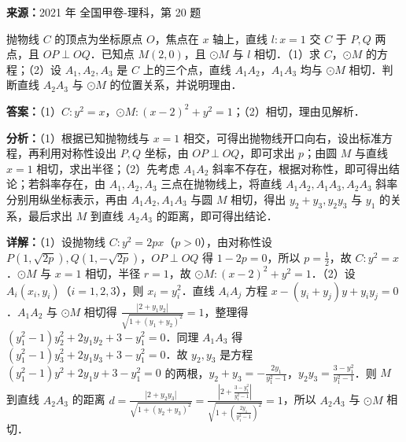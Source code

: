 \begin{question}[points=12]
\textbf{来源：}2021 年 全国甲卷-理科，第 20 题\par
抛物线 $C$ 的顶点为坐标原点 $O$，焦点在 $x$ 轴上，直线 $l: x=1$ 交 $C$ 于 $P, Q$ 两点，且 $OP \perp OQ$．已知点 $M(2,0)$，且 $\odot M$ 与 $l$ 相切．（1）求 $C$，$\odot M$ 的方程；（2）设 $A_1, A_2, A_3$ 是 $C$ 上的三个点，直线 $A_1A_2$，$A_1A_3$ 均与 $\odot M$ 相切．判断直线 $A_2A_3$ 与 $\odot M$ 的位置关系，并说明理由．
\begin{solution}
\textbf{答案：}（1）$C: y^2 = x$，$\odot M: (x-2)^2 + y^2 = 1$；（2）相切，理由见解析．

\textbf{分析：}（1）根据已知抛物线与 $x=1$ 相交，可得出抛物线开口向右，设出标准方程，再利用对称性设出 $P, Q$ 坐标，由 $OP \perp OQ$，即可求出 $p$；由圆 $M$ 与直线 $x=1$ 相切，求出半径；（2）先考虑 $A_1A_2$ 斜率不存在，根据对称性，即可得出结论；若斜率存在，由 $A_1, A_2, A_3$ 三点在抛物线上，将直线 $A_1A_2, A_1A_3, A_2A_3$ 斜率分别用纵坐标表示，再由 $A_1A_2, A_1A_3$ 与圆 $M$ 相切，得出 $y_2+y_3, y_2y_3$ 与 $y_1$ 的关系，最后求出 $M$ 到直线 $A_2A_3$ 的距离，即可得出结论．

\textbf{详解：}（1）设抛物线 $C: y^2 = 2px$（$p>0$），由对称性设 $P(1, \sqrt{2p}), Q(1, -\sqrt{2p})$，$OP \perp OQ$ 得 $1-2p=0$，所以 $p=\frac{1}{2}$，故 $C: y^2 = x$．$\odot M$ 与 $x=1$ 相切，半径 $r=1$，故 $\odot M: (x-2)^2 + y^2 = 1$．（2）设 $A_i(x_i, y_i)$（$i=1,2,3$），则 $x_i = y_i^2$．直线 $A_iA_j$ 方程 $x - (y_i+y_j)y + y_i y_j = 0$．$A_1A_2$ 与 $\odot M$ 相切得 $\frac{|2 + y_1y_2|}{\sqrt{1+(y_1+y_2)^2}} = 1$，整理得 $(y_1^2-1)y_2^2 + 2y_1 y_2 + 3 - y_1^2 = 0$．同理 $A_1A_3$ 得 $(y_1^2-1)y_3^2 + 2y_1 y_3 + 3 - y_1^2 = 0$．故 $y_2, y_3$ 是方程 $(y_1^2-1)y^2 + 2y_1 y + 3 - y_1^2 = 0$ 的两根，$y_2+y_3 = -\frac{2y_1}{y_1^2-1}$，$y_2y_3 = \frac{3-y_1^2}{y_1^2-1}$．则 $M$ 到直线 $A_2A_3$ 的距离 $d = \frac{|2 + y_2y_3|}{\sqrt{1+(y_2+y_3)^2}} = \frac{\left|2+\frac{3-y_1^2}{y_1^2-1}\right|}{\sqrt{1+\left(\frac{2y_1}{y_1^2-1}\right)^2}} = 1$，所以 $A_2A_3$ 与 $\odot M$ 相切．
\end{solution}
\end{question}

